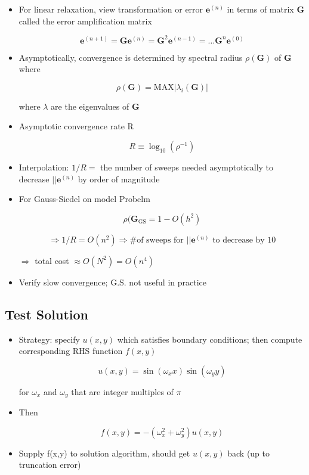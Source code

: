 \begin{itemize}
    \item For linear relaxation, view transformation or error $\mathbf{e}^{(n)}$ in terms of matrix $\mathbf{G}$ called the error amplification matrix

    \[ \mathbf{e}^{(n+1)} = \mathbf{G}\mathbf{e}^{(n)} = \mathbf{G}^2\mathbf{e}^{(n-1)} = \ldots \mathbf{G}^n \mathbf{e}^{(0)}\]

    \item Asymptotically, convergence is determined by spectral radius $\rho(\mathbf{G})$ of $\mathbf{G}$ where

    \[ \rho(\mathbf{G}) = \text{MAX} | \lambda_i (\mathbf{G})| \]

    where $\lambda$ are the eigenvalues of $\mathbf{G}$

    \item Asymptotic convergence rate R

    \[ R \equiv \log_{10}(\rho^{-1})\]

    \item Interpolation: $1/R =$ the number of sweeps needed asymptotically to decrease $||\mathbf{e}^{(n)}$ by order of magnitude 

    \item For Gauss-Siedel on model Probelm

    \[ \rho(\mathbf{G}_{\text{GS}} = 1-O(h^2)\]

    \[ \Rightarrow 1/R = O(n^2) \Rightarrow \text{\# of sweeps for } ||\mathbf{e}^{(n)} \text{ to decrease by 10}\]

    $\Rightarrow$ total cost $\approx O(N^2) = O(n^4)$

    \item Verify slow convergence; G.S. not useful in practice
    
\end{itemize}

\subsection{Test Solution}

\begin{itemize}
    \item Strategy: specify $u(x,y)$ which satisfies boundary conditions; then compute corresponding RHS function $f(x,y)$

    \[ u(x,y) = \sin(\omega_x x) \sin(\omega_y y)\]

    for $\omega_x$ and $\omega_y$ that are integer multiples of $\pi$

    \item Then 

    \[ f(x,y) = - (\omega_x^2+\omega_y^2) u(x,y)\]

    \item Supply f(x,y) to solution algorithm, should get $u(x,y)$ back (up to truncation error)

    
\end{itemize}

